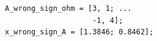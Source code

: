 \documentclass[border=12pt]{standalone}
\begin{document}
\begin{lstlisting}[style=matlab]
A_wrong_sign_ohm = [3, 1; ...
                    -1, 4];
x_wrong_sign_A = [1.3846; 0.8462];
\end{lstlisting}
\end{document}
